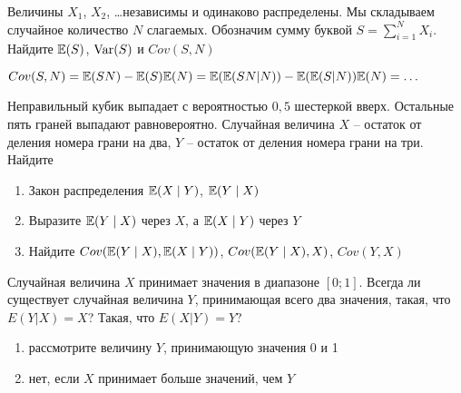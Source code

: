 \begin{problem}
Величины $X_1$, $X_2$, \ldots независимы и одинаково распределены. Мы складываем случайное количество $N$ слагаемых. Обозначим сумму буквой $S=\sum_{i=1}^{N}X_i$. Найдите $\mathbb{E}(S)$, $\operatorname{Var}(S)$ и $Cov(S,N)$

\begin{sol}
 $Cov(S,N)=\mathbb{E}(SN)-\mathbb{E}(S)\mathbb{E}(N)=\mathbb{E}(\mathbb{E}(SN|N))-\mathbb{E}(\mathbb{E}(S|N))\mathbb{E}(N)=\ldots$
\end{sol}
\end{problem}

\begin{problem}
Неправильный кубик выпадает с вероятностью $0{,}5$ шестеркой вверх. Остальные пять граней выпадают равновероятно. Случайная величина $X$ -- остаток от деления номера грани на два, $Y$ -- остаток от деления номера грани на три. Найдите
\begin{enumerate}
\item Закон распределения $\mathbb{E}(X\mid Y)$, $\mathbb{E}(Y\mid X)$
\item Выразите $\mathbb{E}(Y\mid X)$ через $X$, а $\mathbb{E}(X\mid Y)$ через $Y$
\item Найдите $Cov(\mathbb{E}(Y\mid X),\mathbb{E}(X\mid Y))$, $Cov(\mathbb{E}(Y\mid X),X)$, $Cov(Y,X)$
\end{enumerate}

\begin{sol}

\end{sol}
\end{problem}

\begin{problem}
Случайная величина $X$ принимает значения в диапазоне $[0;1]$. Всегда ли существует случайная величина $Y$, принимающая всего два значения, такая, что $E(Y|X)=X$? Такая, что $E(X|Y)=Y$?

\begin{sol}
\begin{enumerate}
\item рассмотрите величину $Y$, принимающую значения 0 и 1
\item нет, если $X$ принимает больше значений, чем $Y$
\end{enumerate}
\end{sol}
\end{problem}

